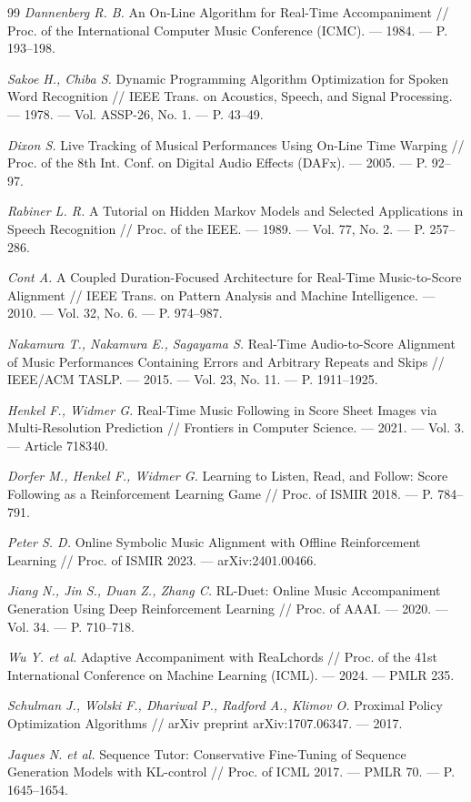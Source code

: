 \documentclass[%
  aps,pre,
  superscriptaddress,
  longbibliography,nofootinbib,
  showkeys,
  amsmath,amssymb,floatfix
]{revtex4-2}
\begin{document}
\begin{thebibliography}{99}
\textit{Dannenberg R. B.} An On-Line Algorithm for Real-Time
Accompaniment // Proc. of the International Computer Music
Conference (ICMC). --- 1984. --- P. 193--198.

\textit{Sakoe H., Chiba S.} Dynamic Programming Algorithm
Optimization for Spoken Word Recognition // IEEE Trans. on
Acoustics, Speech, and Signal Processing. --- 1978. ---
Vol. ASSP-26, No. 1. --- P. 43--49.

\textit{Dixon S.} Live Tracking of Musical Performances Using
On-Line Time Warping // Proc. of the 8th Int. Conf. on Digital
Audio Effects (DAFx). --- 2005. --- P. 92--97.

\textit{Rabiner L. R.} A Tutorial on Hidden Markov Models and
Selected Applications in Speech Recognition // Proc. of the
IEEE. --- 1989. --- Vol. 77, No. 2. --- P. 257--286.

\textit{Cont A.} A Coupled Duration-Focused Architecture for
Real-Time Music-to-Score Alignment // IEEE Trans. on Pattern
Analysis and Machine Intelligence. --- 2010. --- Vol. 32,
No. 6. --- P. 974--987.

\textit{Nakamura T., Nakamura E., Sagayama S.} Real-Time
Audio-to-Score Alignment of Music Performances Containing
Errors and Arbitrary Repeats and Skips // IEEE/ACM TASLP. ---
2015. --- Vol. 23, No. 11. --- P. 1911--1925.

\textit{Henkel F., Widmer G.} Real-Time Music Following in Score
Sheet Images via Multi-Resolution Prediction // Frontiers in
Computer Science. --- 2021. --- Vol. 3. --- Article 718340.

\textit{Dorfer M., Henkel F., Widmer G.} Learning to Listen,
Read, and Follow: Score Following as a Reinforcement Learning
Game // Proc. of ISMIR 2018. --- P. 784--791.

\textit{Peter S. D.} Online Symbolic Music Alignment with
Offline Reinforcement Learning // Proc. of ISMIR 2023. ---
arXiv:2401.00466.

\textit{Jiang N., Jin S., Duan Z., Zhang C.} RL-Duet: Online
Music Accompaniment Generation Using Deep Reinforcement
Learning // Proc. of AAAI. --- 2020. --- Vol. 34. ---
P. 710--718.

\textit{Wu Y. et al.} Adaptive Accompaniment with ReaLchords //
Proc. of the 41st International Conference on Machine Learning
(ICML). --- 2024. --- PMLR 235.

\textit{Schulman J., Wolski F., Dhariwal P., Radford A.,
Klimov O.} Proximal Policy Optimization Algorithms //
arXiv preprint arXiv:1707.06347. --- 2017.

\textit{Jaques N. et al.} Sequence Tutor: Conservative
Fine-Tuning of Sequence Generation Models with KL-control //
Proc. of ICML 2017. --- PMLR 70. --- P. 1645--1654.

\end{thebibliography}
\end{document}

